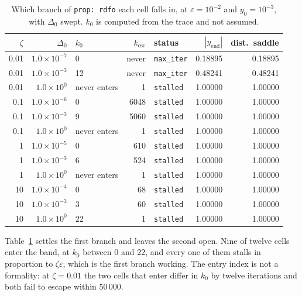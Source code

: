 \documentclass[11pt,a4paper]{article}
\providecommand{\abs}[1]{\left \vert #1 \right \vert}
\theoremstyle{definition}
\theoremstyle{remark}
\begin{document}
\begin{table}[H]
  \centering\small
  \caption{Which branch of \texttt{prop: rdfo} each cell falls in, at
    $\varepsilon = 10^{-2}$ and $y_0 = 10^{-3}$, with $\Delta_0$ swept. $k_0$ is
    computed from the trace and not assumed.}
  \label{tab: dfo scan}
  \begin{tabular}{rrlrlrr}
    \toprule
    $\zeta$ & $\Delta_0$ & $k_0$ & $k_{\mathrm{esc}}$ & status
      & $\abs{y_{\mathrm{end}}}$ & dist.\ saddle \\
    \midrule
    0.01 & $1.0\times10^{-7}$ & 0            & never & \texttt{max\_iter} & 0.18895 & 0.18895 \\
    0.01 & $1.0\times10^{-3}$ & 12           & never & \texttt{max\_iter} & 0.48241 & 0.48241 \\
    0.01 & $1.0\times10^{0}$  & never enters & 1     & \texttt{stalled}   & 1.00000 & 1.00000 \\
    \midrule
    0.1  & $1.0\times10^{-6}$ & 0            & 6048  & \texttt{stalled}   & 1.00000 & 1.00000 \\
    0.1  & $1.0\times10^{-3}$ & 9            & 5060  & \texttt{stalled}   & 1.00000 & 1.00000 \\
    0.1  & $1.0\times10^{0}$  & never enters & 1     & \texttt{stalled}   & 1.00000 & 1.00000 \\
    \midrule
    1    & $1.0\times10^{-5}$ & 0            & 610   & \texttt{stalled}   & 1.00000 & 1.00000 \\
    1    & $1.0\times10^{-3}$ & 6            & 524   & \texttt{stalled}   & 1.00000 & 1.00000 \\
    1    & $1.0\times10^{0}$  & never enters & 1     & \texttt{stalled}   & 1.00000 & 1.00000 \\
    \midrule
    10   & $1.0\times10^{-4}$ & 0            & 68    & \texttt{stalled}   & 1.00000 & 1.00000 \\
    10   & $1.0\times10^{-3}$ & 3            & 60    & \texttt{stalled}   & 1.00000 & 1.00000 \\
    10   & $1.0\times10^{0}$  & 22           & 1     & \texttt{stalled}   & 1.00000 & 1.00000 \\
    \bottomrule
  \end{tabular}
\end{table}

Table~\ref{tab: dfo scan} settles the first branch and leaves the second open.
Nine of twelve cells enter the band, at $k_0$ between $0$ and $22$, and every one
of them stalls in proportion to $\zeta\varepsilon$, which is the first branch
working. The entry index is not a formality: at $\zeta = 0.01$ the two cells that
enter differ in $k_0$ by twelve iterations and both fail to escape within
$50\,000$.
\end{document}
